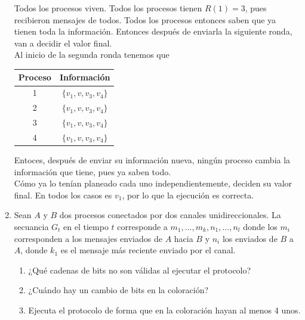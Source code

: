 \documentclass[12pt,a4paper]{report}
\begin{document}
\begin{enumerate}
{\begin{enumerate} [label = \alph*)]
{				Todos los procesos viven. Todos los procesos tienen $R(1) = 3$, pues
				recibieron mensajes de todos. Todos los procesos entonces saben que
				ya tienen toda la información. Entonces después de enviarla la siguiente
				ronda, van a decidir el valor final.\\

				Al inicio de la segunda ronda tenemos que

				\begin{center}
					\begin{tabular}{|c|c|}
						\hline
						Proceso & Información\\
						\hline
						1 & $\{v_1, v, v_3, v_4\}$\\
						\hline
						2 & $\{v_1, v, v_3, v_4\}$\\
						\hline
						3 & $\{v_1, v, v_3, v_4\}$\\
						\hline
						4 & $\{v_1, v, v_3, v_4\}$\\
						\hline
					\end{tabular}
				\end{center}
				Entoces, después de enviar su información nueva, ningún proceso cambia
				la información que tiene, pues ya saben todo.\\
				Cómo ya lo tenían planeado cada uno independientemente, deciden su valor
				final. En todos los casos es $v_1$, por lo que la ejecución es correcta.\\
			}
		\end{enumerate}

	}



	\item {
		Sean $A$ y $B$ dos procesos conectados por dos canales unidireccionales.
		La secuancia $G_t$ en el tiempo $t$ corresponde a $m_1, ..., m_k, n_1, ..., n_l$
		donde los $m_i$ corresponden a los mensajes enviados de $A$ hacia $B$ y $n_i$
		los enviados de $B$ a $A$, donde $k_1$ es el mensaje más reciente enviado
		por el canal.

		\begin{enumerate} [label = \alph*]
			\item {
				¿Qué cadenas de bits no son válidas al ejecutar el protocolo?
			}
			\item{
				¿Cuándo hay un cambio de bits en la coloración?
			}
			\item{
				Ejecuta el protocolo de forma que en la coloración hayan al menos 4 unos.
			}
		\end{enumerate}

}
\end{enumerate}
\end{document}
